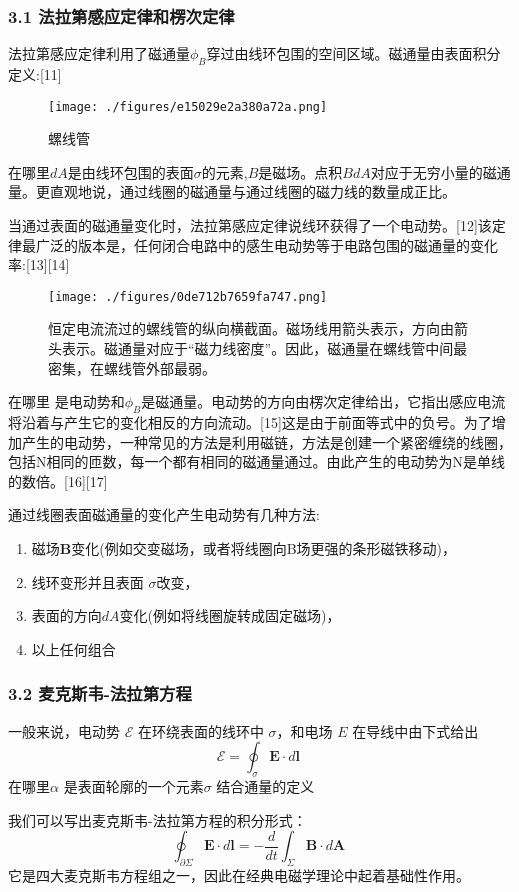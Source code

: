 \subsubsection{3.1 法拉第感应定律和楞次定律}
法拉第感应定律利用了磁通量$\phi_B$穿过由线环包围的空间区域。磁通量由表面积分定义:[11]
\begin{figure}[ht]
\centering
\texttt{[image: ./figures/e15029e2a380a72a.png]}
\caption{螺线管} \label{fig_DCGY_5}
\end{figure}
在哪里$dA$是由线环包围的表面$\sigma$的元素,$B$是磁场。点积$BdA$对应于无穷小量的磁通量。更直观地说，通过线圈的磁通量与通过线圈的磁力线的数量成正比。

当通过表面的磁通量变化时，法拉第感应定律说线环获得了一个电动势。[12]该定律最广泛的版本是，任何闭合电路中的感生电动势等于电路包围的磁通量的变化率:[13][14]
\begin{figure}[ht]
\centering
\texttt{[image: ./figures/0de712b7659fa747.png]}
\caption{恒定电流流过的螺线管的纵向横截面。磁场线用箭头表示，方向由箭头表示。磁通量对应于“磁力线密度”。因此，磁通量在螺线管中间最密集，在螺线管外部最弱。} \label{fig_DCGY_6}
\end{figure}
在哪里  是电动势和$\phi_B$是磁通量。电动势的方向由楞次定律给出，它指出感应电流将沿着与产生它的变化相反的方向流动。[15]这是由于前面等式中的负号。为了增加产生的电动势，一种常见的方法是利用磁链，方法是创建一个紧密缠绕的线圈，包括N相同的匝数，每一个都有相同的磁通量通过。由此产生的电动势为N是单线的数倍。[16][17]

通过线圈表面磁通量的变化产生电动势有几种方法:
\begin{enumerate}
\item 磁场$\mathbf B$变化(例如交变磁场，或者将线圈向B场更强的条形磁铁移动)，
\item 线环变形并且表面 $\sigma$改变，
\item 表面的方向$dA$变化(例如将线圈旋转成固定磁场)，
\item 以上任何组合
\end{enumerate}
\subsubsection{3.2 麦克斯韦-法拉第方程}
一般来说，电动势 $\mathcal{E}$ 在环绕表面的线环中 $\sigma$，和电场 $E$ 在导线中由下式给出
$$\mathcal{E} = \oint_{\sigma} \mathbf{E} \cdot d\mathbf{l}~$$
在哪里$\alpha$ 是表面轮廓的一个元素$\sigma$ 结合通量的定义

我们可以写出麦克斯韦-法拉第方程的积分形式：
$$\oint_{\partial \Sigma} \mathbf{E} \cdot d\mathbf{l} = -\frac{d}{dt} \int_{\Sigma} \mathbf{B} \cdot d\mathbf{A}~$$
它是四大麦克斯韦方程组之一，因此在经典电磁学理论中起着基础性作用。
